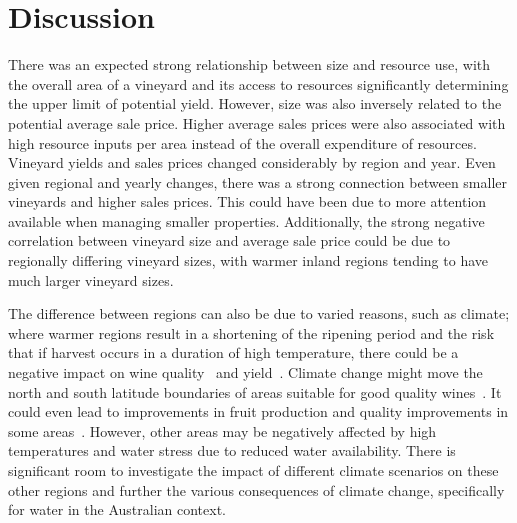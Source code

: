 \documentclass[10pt,letterpaper]{article}
\begin{document}
%
%
%
%


\section*{Discussion}

There was an expected strong relationship between size and resource use, with the overall area of a vineyard and its access to resources significantly determining the upper limit of potential yield. However, size was also inversely related to the potential average sale price. Higher average sales prices were also associated with high resource inputs per area instead of the overall expenditure of resources. Vineyard yields and sales prices changed considerably by region and year. Even given regional and yearly changes, there was a strong connection between smaller vineyards and higher sales prices. This could have been due to more attention available when managing smaller properties. Additionally, the strong negative correlation between vineyard size and average sale price could be due to regionally differing vineyard sizes, with warmer inland regions tending to have much larger vineyard sizes.
\par
The difference between regions can also be due to varied reasons, such as climate; where warmer regions result in a shortening of the ripening period and the risk that if harvest occurs in a duration of high temperature, there could be a negative impact on wine quality~\cite{salazar_parra_effects_2010, duchene_grapevine_2005, jones_climate_2000} and yield~\cite{mira_de_orduna_climate_2010, iglesias_regional_2012}. Climate change might move the north and south latitude boundaries of areas suitable for good quality wines~\cite{schultz_climate_2010}. It could even lead to improvements in fruit production and quality improvements in some areas~\cite{olesen_consequences_2002}. However, other areas may be negatively affected by high temperatures and water stress due to reduced water availability. There is significant room to investigate the impact of different climate scenarios on these other regions and further the various consequences of climate change, specifically for water in the Australian context.
\par
\end{document}
